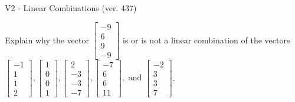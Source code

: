 \begin{exercise}
  \begin{exerciseTitle}V2 - Linear Combinations (ver. 437)\end{exerciseTitle}
  \begin{exerciseStatement}
    Explain why the vector \(\left[\begin{array}{c}
-9 \\
6 \\
9 \\
-9
\end{array}\right]\)  is or is not a linear 
	combination of the vectors \(\left[\begin{array}{c}
-1 \\
1 \\
1 \\
2
\end{array}\right] , \left[\begin{array}{c}
1 \\
0 \\
0 \\
1
\end{array}\right] , \left[\begin{array}{c}
2 \\
-3 \\
-3 \\
-7
\end{array}\right] , \left[\begin{array}{c}
-7 \\
6 \\
6 \\
11
\end{array}\right] , \text{ and } \left[\begin{array}{c}
-2 \\
3 \\
3 \\
7
\end{array}\right]\).
	



\end{exerciseStatement}
\end{exercise}
